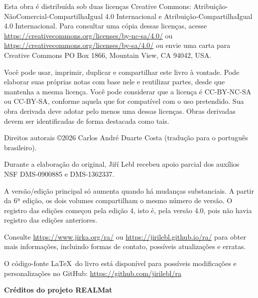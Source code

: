 \documentclass[12pt]{book}
\newcommand{\ignore}[1]{}
\theoremstyle{plain}
\theoremstyle{remark}
\theoremstyle{definition}
\theoremstyle{exercise}
\theoremstyle{example}
\begin{document}
\bigskip

\noindent
Esta obra
é distribuída sob duas licenças Creative Commons:
Atribuição-NãoComercial-CompartilhaIgual 4.0 Internacional e
Atribuição-CompartilhaIgual 4.0 Internacional.
Para consultar uma cópia dessas licenças, acesse
\url{https://creativecommons.org/licenses/by-nc-sa/4.0/}
ou
\url{https://creativecommons.org/licenses/by-sa/4.0/}
ou envie uma carta para
Creative Commons
PO Box 1866, Mountain View, CA 94042, USA\@.

\bigskip

\noindent
Você pode usar, imprimir, duplicar e compartilhar este livro à vontade. Pode
elaborar suas próprias notas com base nele e reutilizar partes, desde que
mantenha a mesma licença. Você pode considerar que a licença é CC-BY-NC-SA ou
CC-BY-SA, conforme aquela que for compatível com o uso pretendido.
Sua obra derivada deve adotar pelo menos uma dessas licenças.
Obras derivadas devem ser identificadas de forma destacada como tais.

\bigskip

\noindent
Direitos autorais \copyright 2026 Carlos André Duarte Costa (tradução para o português brasileiro).

\noindent
Durante a elaboração do original, Jiří Lebl recebeu apoio parcial dos auxílios
NSF DMS-0900885 e DMS-1362337.

\bigskip

\noindent
A versão/edição principal só aumenta quando há mudanças substanciais.
A partir da 6ª edição, os dois volumes compartilham o mesmo número de versão.
O registro das edições começou pela edição 4, isto é, pela versão 4.0, pois
não havia registro das edições anteriores.  %

\bigskip

\noindent
Consulte \url{https://www.jirka.org/ra/} ou
\url{https://jirilebl.github.io/ra/} para obter mais informações, incluindo
formas de contato, possíveis atualizações e erratas.


\bigskip

\noindent
O código-fonte \LaTeX\ do livro está disponível para possíveis modificações e
personalizações no GitHub: \url{https://github.com/jirilebl/ra}


\clearpage
\thispagestyle{empty}
\begin{center}
{\Large\bfseries Créditos do projeto REALMat}
\end{center}
\end{document}

